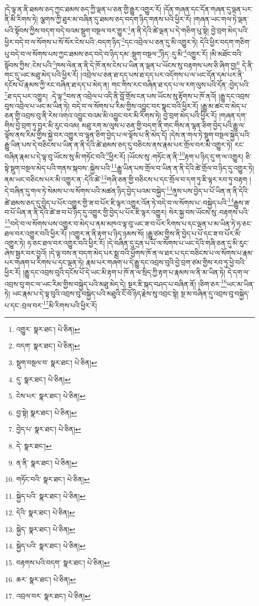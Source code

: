 །དེ་ལྟ་ན་ནི་ཐམས་ཅད་ཀྱང་ཐམས་ཅད་ཀྱི་ལྡན་པ་ཅན་གྱི་རྒྱུར་འགྱུར་རོ། །དོན་གཞན་དང་དོན་གཞན་དུ་ལྡན་པར་ནི་མི་རིགས་ཏེ། ལྕགས་ཀྱི་ཐུར་མ་བཞིན་དུ་ཐམས་ཅད་བདག་ཉིད་གནས་པའི་ཕྱིར་རོ། །གཞན་ཡང་གལ་ཏེ་ལྡན་པའི་སྟོབས་ཀྱིས་བདག་བདེ་བའམ་སྡུག་བསྔལ་བར་གྱུར་\footnote{འགྱུར་  སྣར་ཐང་།  པེ་ཅིན། }ན་ནི་དེའི་ཚེ་ལྡན་པ་དེ་གཅིག་པུ་སྟེ། བྱེ་བྲག་མེད་པའི་ཕྱིར་བདེ་བ་ལ་སོགས་པ་སོ་སོར་ངེས་པའི་:བདག་ཉིད་\footnote{བདག་  སྣར་ཐང་།  པེ་ཅིན། }དང་འབྲེལ་པ་ཅན་དུ་མི་འགྱུར་ཏེ། དེའི་ཕྱིར་བདག་གཅིག་པུ་བདེ་བ་ལ་སོགས་པས་ཀྱང་ཐམས་ཅད་བདེ་བ་ཉིད་དམ་:སྡུག་བསྔལ་\footnote{སྡུག་བསྔལ་བ་  སྣར་ཐང་།  པེ་ཅིན། }ཉིད་:དུ་མི་\footnote{དུ་  སྣར་ཐང་།  པེ་ཅིན། }འགྱུར་རོ། །མི་མཐོང་བའི་སྟོབས་ཀྱིས་:ངེས་པའི་\footnote{ངེས་པར་  སྣར་ཐང་།  པེ་ཅིན། }ཁས་ལེན་ན་ནི་དེ་ཁོ་ནས་ངེས་པ་ཡིན་ན་ལྡན་པ་ཡོངས་སུ་བརྟགས་པས་ཅི་ཞིག་བྱ།\footnote{བྱ་སྟེ།  སྣར་ཐང་།  པེ་ཅིན། } དེ་ནི་གང་དུ་ཡང་མཐུ་མེད་པའི་ཕྱིར་རོ། །འབྲེལ་པ་ཅན་ཐ་དད་པས་ཐ་དད་པར་འདོགས་པ་ལ་ཡང་དོན་དམ་པར་ནི་དངོས་པོ་རྣམས་ཀྱི་རང་བཞིན་ཐ་དད་པ་མེད་ན། གང་གིས་རང་བཞིན་ཐ་དད་པ་ལ་རག་ལུས་པའི་དོན་:བྱེད་པའི་\footnote{བྱེད་པ་  སྣར་ཐང་།  པེ་ཅིན། }ཐ་དད་པར་འགྱུར། :དེ་ལྟ་\footnote{དེ་  སྣར་ཐང་། }བས་ན་འབྲེལ་པ་འདི་ནི་བློ་གྲོས་ངན་པས་ཡོངས་སུ་རྟོགས་པ་ཁོ་ནའོ། །རྒྱུ་དང་འབྲས་བུས་འབྲེལ་པ་ཡང་མ་ཡིན་ཏེ། བདེ་བ་ལ་སོགས་པ་རིམ་གྱིས་འབྱུང་བར་སྣང་བའི་ཕྱིར་རོ། །རྒྱུ་མ་ཚང་བ་མེད་པ་ཅན་གྱི་འབྲས་བུ་ནི་རེས་འགའ་འབྱུང་བའམ་མི་འབྱུང་བར་མི་རིགས་ཏེ། བྱེ་བྲག་མེད་པའི་ཕྱིར་རོ། །གཞན་དག་གིས་བྱེ་བྲག་ཏུ་བྱར་མི་རུང་བའམ། མཐུ་རག་མ་ལུས་པ་ཅན་གྱི་བདག་ནི་གང་གིས་ན་ལྷན་ཅིག་བྱེད་པའི་རྒྱུ་ལ་ལྟོས་ནས་རིམ་གྱིས་སྐྱེ་བར་འགྱུར་བ་ལྷན་ཅིག་བྱེད་པ་ལ་ལྟོས་པ་ནི་མེད་དོ། །དེས་ན་གལ་ཏེ་སྡུག་བསྔལ་སྐྱེད་པའི་རྒྱུ་ཡིན་པས་དེ་བཅིངས་པ་ཡིན་ན་ནི་དེའི་ཚེ་ཐམས་ཅད་དུ་བཅིངས་ནས་རྣམ་པར་གྲོལ་བར་མི་འགྱུར་ཏེ། རང་བཞིན་རྣམ་པ་དེ་ལྟ་བུ་ཡོངས་སུ་མི་གཏོང་བའི་\footnote{ན་ནི་  སྣར་ཐང་།  པེ་ཅིན། }ཕྱིར་རོ། །ཡོངས་སུ་:གཏོང་ན་ནི་\footnote{གཏོང་བའི་  སྣར་ཐང་།  པེ་ཅིན། }རྟག་པ་ཉིད་དུ་ག་ལ་འགྱུར། ཅི་སྟེ་སྡུག་བསྔལ་མེད་པའི་གནས་སྐབས་:སྐྱེས་པའི་\footnote{སྐྱེད་པའི་  སྣར་ཐང་།  པེ་ཅིན། }རྒྱུ་ཡིན་པས་གྲོལ་བ་ཡིན་ན་ནི་དེའི་ཚེ་གྲོལ་བ་ཉིད་དུ་འགྱུར་ཏེ། ནམ་ཡང་བཅིངས་པར་མི་འགྱུར་ན་:དེའི་ཚེ་\footnote{དེའི་  སྣར་ཐང་།  པེ་ཅིན། }གཞི་ཅན་གྱི་བཅིངས་པ་དང་གྲོལ་བ་དག་ཏུ་ཇི་ལྟར་རབ་ཏུ་བརྟག །དེ་བཞིན་དུ་གལ་ཏེ་སེམས་པ་ལ་སོགས་པའི་མཚན་ཉིད་བྱེད་པའམ་བསྐྱེད་\footnote{སྐྱེད་  སྣར་ཐང་།  པེ་ཅིན། }ནུས་པས་བྱེད་པ་པོ་ཡིན་ན་ནི་དེའི་ཚེ་ཐམས་ཅད་དུ་བྱེད་པ་པོར་འགྱུར་གྱི་ཟ་བ་པོར་ཇི་ལྟར་འགྱུར་འོན་ཏེ་བདེ་བ་ལ་སོགས་པ་:བསྐྱེད་པའི་\footnote{སྐྱེད་པའི་  སྣར་ཐང་།  པེ་ཅིན། }རྒྱུས་ཟ་བ་པོ་ཡིན་ན་ནི་དེའི་ཚེ་ཟ་བ་པོ་ཉིད་དུ་འགྱུར་གྱི་བྱེད་པ་པོར་ཇི་ལྟར་འགྱུར། སེར་སྐྱ་བས་ཡོངས་སུ་:བརྟགས་པའི་\footnote{བརྟགས་པའི་བདག་  སྣར་ཐང་།  པེ་ཅིན། }བདེ་བ་ལ་སོགས་པས་འགྱུར་བ་མེད་པ་ནམ་མཁའ་ལྟ་བུ་ཡང་ཟ་བ་པོར་རིགས་པ་དང་ལྡན་པ་མ་ཡིན་ཏེ་ཧ་ཅང་ཐལ་བར་འགྱུར་བའི་ཕྱིར་རོ། །འགྱུར་ན་ནི་རྟག་པ་ཉིད་ཉམས་སོ། །རྒྱུ་ཙམ་གྱིས་ནི་བྱེད་པ་པོ་དང་ཟ་བ་པོར་མི་འགྱུར་ཏེ། ཧ་ཅང་ཐལ་བར་འགྱུར་བའི་ཕྱིར་རོ། །དེ་བཞིན་དུ་དྲན་པ་པོ་ལ་སོགས་པ་ཡང་དེའི་གཞི་ཅན་དུ་མི་རུང་ཞེས་སྦྱར་བར་བྱའོ། །དེ་ལྟ་བས་ན་བདག་མེད་པར་སྨྲ་བའི་ཕྱོགས་ཁོ་ན་ལ་ཐར་པ་དང་བཅིངས་པ་ལ་སོགས་པ་རྣམ་པར་གཞག་པ་རིགས་པ་དང་ལྡན་ཏེ། རྣམ་པར་གཞག་པ་དེ་རྒྱུ་དང་འབྲས་བུའི་བྱེ་བྲག་ཙམ་གྱིས་རབ་ཏུ་ཕྱེ་བའི་ཕྱིར་རོ། །རྒྱུ་དང་འབྲས་བུའི་དངོས་པོ་དེ་ཡང་མི་རྟག་པ་ཁོ་ན་ལ་སྲིད་ཀྱི་རྟག་པ་རྣམས་ལ་ནི་མ་ཡིན་ཏེ། དེ་དག་ལ་འབྲས་བུ་གང་ལ་ཡང་རིམ་གྱིས་བསྐྱེད་པའི་མཐུ་མེད་དེ། སྔར་ཇི་སྐད་བཤད་པ་བཞིན་ནོ། །ཅིག་ཅར་\footnote{ཆར་  སྣར་ཐང་།  པེ་ཅིན། }ཡང་མ་ཡིན་ཏེ། ཡང་རྣམ་པ་དེ་ལྟ་བུའི་འབྲས་བུ་བསྐྱེད་པའི་མཐུའི་ངོ་བོ་ཉིད་རྗེས་སུ་འབྲང་སྟེ། སྔ་མ་བཞིན་དུ་འབྲས་བུ་བསྐྱེད་པ་དང་:བྲལ་བར་\footnote{འབྲལ་བར་  སྣར་ཐང་།  པེ་ཅིན། }མི་རིགས་པའི་ཕྱིར་རོ། 